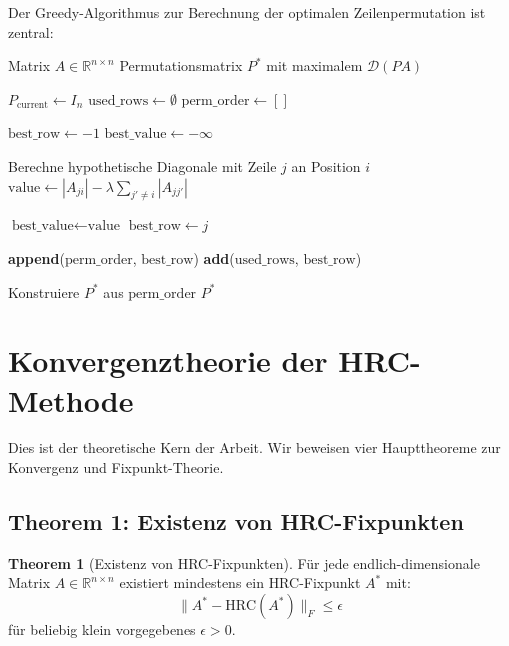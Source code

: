 \documentclass[a4paper,12pt]{article}
\theoremstyle{definition}
\newtheorem{theorem}{Theorem}
\begin{document}
Der Greedy-Algorithmus zur Berechnung der optimalen Zeilenpermutation ist zentral:

\begin{algorithm}[H]
\caption{GreedyPermutation: Optimale Zeilenpermutation}
\begin{algorithmic}[1]
\Require Matrix $A \in \mathbb{R}^{n \times n}$
\Ensure Permutationsmatrix $P^*$ mit maximalem $\mathcal{D}(PA)$

\State $P_{\text{current}} \gets I_n$ 
\State $\text{used\_rows} \gets \emptyset$
\State $\text{perm\_order} \gets []$

	\State $\text{best\_row} \gets -1$
	\State $\text{best\_value} \gets -\infty$
	
			\State Berechne hypothetische Diagonale mit Zeile $j$ an Position $i$
			\State $\text{value} \gets |A_{ji}| - \lambda \sum_{j' \neq i} |A_{jj'}|$ 
			
				\State $\text{best\_value} \gets \text{value}$
				\State $\text{best\_row} \gets j$
			\EndIf
		\EndIf
	\EndFor
	
	\State \textbf{append}($\text{perm\_order}$, $\text{best\_row}$)
	\State \textbf{add}($\text{used\_rows}$, $\text{best\_row}$)
\EndFor

\State Konstruiere $P^*$ aus $\text{perm\_order}$
\State \Return $P^*$
\end{algorithmic}
\end{algorithm}

\section{Konvergenztheorie der HRC-Methode}

Dies ist der theoretische Kern der Arbeit. Wir beweisen vier Haupttheoreme zur Konvergenz und Fixpunkt-Theorie.

\subsection{Theorem 1: Existenz von HRC-Fixpunkten}

\begin{theorem}[Existenz von HRC-Fixpunkten]
\label{thm:fixpoint_existence}
Für jede endlich-dimensionale Matrix $A \in \mathbb{R}^{n \times n}$ existiert mindestens ein HRC-Fixpunkt $A^*$ mit:
\[
\|A^* - \text{HRC}(A^*)\|_F \leq \epsilon
\]
für beliebig klein vorgegebenes $\epsilon > 0$.
\end{theorem}
\end{document}

